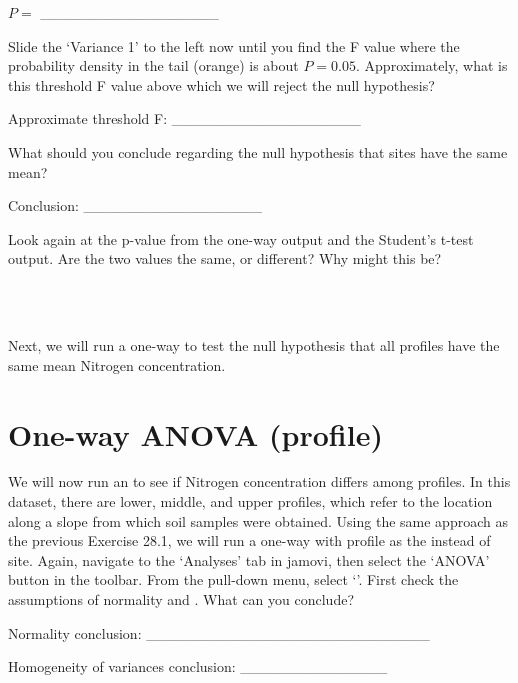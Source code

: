 \documentclass[
  openany]{krantz}
\begin{document}
\(P =\) \_\_\_\_\_\_\_\_\_\_\_\_\_\_\_\_\_

Slide the `Variance 1' to the left now until you find the F value where the probability density in the tail (orange) is about \(P = 0.05\).
Approximately, what is this threshold F value above which we will reject the null hypothesis?

Approximate threshold F: \_\_\_\_\_\_\_\_\_\_\_\_\_\_\_\_\_\_

What should you conclude regarding the null hypothesis that sites have the same mean?

Conclusion: \_\_\_\_\_\_\_\_\_\_\_\_\_\_\_\_\_

Look again at the p-value from the one-way  output and the Student's t-test output.
Are the two values the same, or different?
Why might this be?

\begin{verbatim}



\end{verbatim}

Next, we will run a one-way  to test the null hypothesis that all profiles have the same mean Nitrogen concentration.

\hypertarget{one-way-anova-profile}{%
\section{One-way ANOVA (profile)}\label{one-way-anova-profile}}

We will now run an  to see if Nitrogen concentration differs among profiles.
In this dataset, there are lower, middle, and upper profiles, which refer to the location along a slope from which soil samples were obtained.
Using the same approach as the previous Exercise 28.1, we will run a one-way  with profile as the  instead of site.
Again, navigate to the `Analyses' tab in jamovi, then select the `ANOVA' button in the toolbar.
From the  pull-down menu, select `'.
First check the assumptions of normality and .
What can you conclude?

Normality conclusion: \_\_\_\_\_\_\_\_\_\_\_\_\_\_\_\_\_\_\_\_\_\_\_\_\_\_\_

Homogeneity of variances conclusion: \_\_\_\_\_\_\_\_\_\_\_\_\_\_
\end{document}
